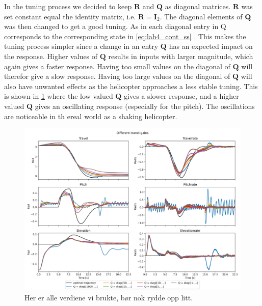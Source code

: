 \documentclass[../main.tex]{subfiles}
\begin{document}
In the tuning process we decided to keep $ \bm R $ and $ \bm Q $ as diagonal matrices. $ \bm R $ was set constant equal the identity matrix, i.e. $\bm R = \bm I_2$. The diagonal elements of $ \bm Q $ was then changed to get a good tuning. As in each diagonal entry in Q corresponds to the corresponding state in \cref{eq:lab4_cont_ss} . This makes the tuning process simpler since a change in an entry $ \bm Q $ has an expected impact on the response. Higher values of $ \bm Q $ results in inputs with larger magnitude, which again gives a faster response. Having too small values on the diagonal of $ \bm Q $ will therefor give a slow response. Having too large values on the diagonal of $ \bm Q $ will also have unwanted effects as the helicopter approaches a less stable tuning. This is shown in \cref{fig:lab4_diff_Q_values} where the low valued $ \bm Q $ gives a slower response, and a higher valued $ \bm Q $ gives an oscillating response (especially for the pitch). The oscillations are noticeable in th ereal world as a shaking helicopter.
\begin{figure}[h]
	\centering
	\includegraphics[width=\linewidth]{figures/LAB4_travel_gains.png}
	\caption{Her er alle verdiene vi brukte, bør nok rydde opp litt.}
	\label{fig:lab4_diff_Q_values}
\end{figure}
\end{document}
